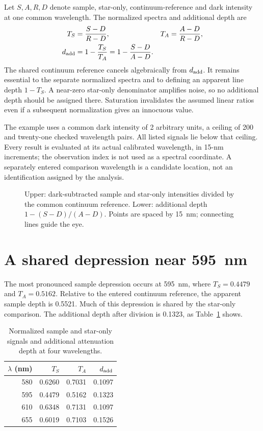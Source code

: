Let $S,A,R,D$ denote sample, star-only, continuum-reference and dark intensity at one common wavelength. The normalized spectra and additional depth are
\begin{align}
 T_S&=\frac{S-D}{R-D},&T_A&=\frac{A-D}{R-D},\\
 d_{\rm add}&=1-\frac{T_S}{T_A}
            =1-\frac{S-D}{A-D}.
 \label{eq:spectral-fingerprints-ratio}
\end{align}
The shared continuum reference cancels algebraically from $d_{\rm add}$. It remains essential to the separate normalized spectra and to defining an apparent line depth $1-T_S$. A near-zero star-only denominator amplifies noise, so no additional depth should be assigned there. Saturation invalidates the assumed linear ratios even if a subsequent normalization gives an innocuous value.

The example uses a common dark intensity of 2 arbitrary units, a ceiling of 200 and twenty-one checked wavelength pairs. All listed signals lie below that ceiling. Every result is evaluated at its actual calibrated wavelength, in 15-nm increments; the observation index is not used as a spectral coordinate. A separately entered comparison wavelength is a candidate location, not an identification assigned by the analysis.

\begin{figure}[t]
\centering

\caption{Upper: dark-subtracted sample and star-only intensities divided by the common continuum reference. Lower: additional depth $1-(S-D)/(A-D)$. Points are spaced by 15~nm; connecting lines guide the eye.}
\label{fig:spectral-fingerprints-data}
\end{figure}

\section{A shared depression near 595~nm}
The most pronounced sample depression occurs at 595~nm, where $T_S=0.4479$ and $T_A=0.5162$. Relative to the entered continuum reference, the apparent sample depth is 0.5521. Much of this depression is shared by the star-only comparison. The additional depth after division is 0.1323, as Table~\ref{tab:spectral-fingerprints-results} shows.

\begin{table}[t]
\caption{Normalized sample and star-only signals and additional attenuation depth at four wavelengths.}
\label{tab:spectral-fingerprints-results}
\centering\footnotesize
\begin{tabular}{@{}rrrr@{}}
\toprule
$\lambda$ (nm)&$T_S$&$T_A$&$d_{\rm add}$\\
\midrule
580&0.6260&0.7031&0.1097\\
595&0.4479&0.5162&0.1323\\
610&0.6348&0.7131&0.1097\\
655&0.6019&0.7103&0.1526\\
\bottomrule
\end{tabular}
\end{table}

